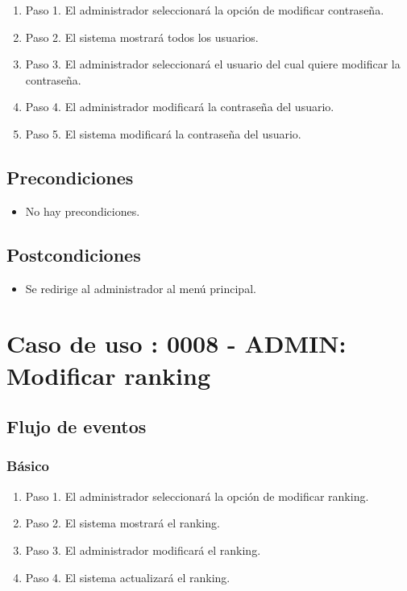 \begin{enumerate}
\item Paso 1.
El administrador seleccionará la opción de modificar contraseña.
\item Paso 2.
El sistema mostrará todos los usuarios.
\item Paso 3.
El administrador seleccionará el usuario del cual quiere modificar la contraseña.
\item Paso 4.
El administrador modificará la contraseña del usuario.
\item Paso 5.
El sistema modificará la contraseña del usuario.
\end{enumerate}

\subsection{Precondiciones}
\begin{itemize}
\item No hay precondiciones.
\end{itemize}

\subsection{Postcondiciones}
\begin{itemize}
\item Se redirige al administrador al menú principal.
\end{itemize}



\section{Caso de uso : 0008 - ADMIN: Modificar ranking}\label{sec:uc0}
\subsection{Flujo de eventos}
\subsubsection{Básico}

\begin{enumerate}
\item Paso 1.
El administrador seleccionará la opción de modificar ranking.
\item Paso 2.
El sistema mostrará el ranking.
\item Paso 3.
El administrador modificará el ranking.
\item Paso 4.
El sistema actualizará el ranking.
\end{enumerate}

